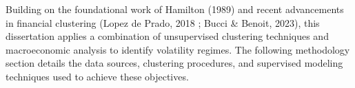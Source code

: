 Building on the foundational work of Hamilton (1989) \cite{hamilton_markov_1989} and recent advancements in financial clustering (Lopez de Prado, 2018 \cite{lopez_de_prado_2018}; Bucci \& Benoit, 2023), this dissertation applies a combination of unsupervised clustering techniques and macroeconomic analysis to identify volatility regimes. The following methodology section details the data sources, clustering procedures, and supervised modeling techniques used to achieve these objectives.
